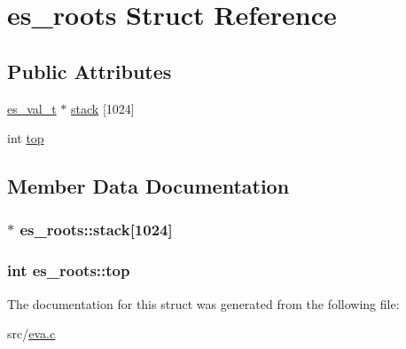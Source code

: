 \hypertarget{structes__roots}{\section{es\-\_\-roots Struct Reference}
\label{structes__roots}
}
\subsection*{Public Attributes}
\begin{DoxyCompactItemize}
\item 
\hyperlink{eva_8h_a31286b308f3660f383b567314be88045}{es\-\_\-val\-\_\-t} $\ast$ \hyperlink{structes__roots_a0bd1fe849cb27ee6d33dcb955e75e2c8}{stack} \mbox{[}1024\mbox{]}
\item 
int \hyperlink{structes__roots_a383630c6fcb8acc9a21c713303bb410e}{top}
\end{DoxyCompactItemize}


\subsection{Member Data Documentation}
\hypertarget{structes__roots_a0bd1fe849cb27ee6d33dcb955e75e2c8}{
\subsubsection[{stack}]{$\ast$ es\-\_\-roots\-::stack\mbox{[}1024\mbox{]}}}\label{structes__roots_a0bd1fe849cb27ee6d33dcb955e75e2c8}
\hypertarget{structes__roots_a383630c6fcb8acc9a21c713303bb410e}{
\subsubsection[{top}]{\setlength{\rightskip}{0pt plus 5cm}int es\-\_\-roots\-::top}}\label{structes__roots_a383630c6fcb8acc9a21c713303bb410e}


The documentation for this struct was generated from the following file\-:\begin{DoxyCompactItemize}
\item 
src/\hyperlink{eva_8c}{eva.\-c}\end{DoxyCompactItemize}
